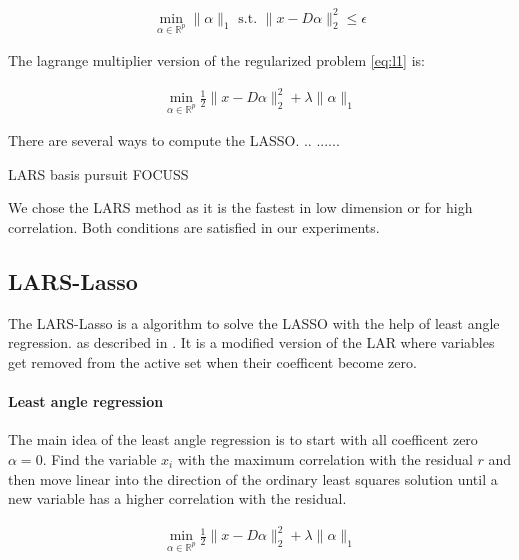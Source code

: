 \begin{align}
\min_{\alpha\in\mathbb{R}^{p}}   \lVert \alpha \rVert_{1}   \textrm{ s.t. } \lVert x - D\alpha \rVert^{2}_{2} \leq \epsilon\label{eq:l1}
\end{align}

The lagrange multiplier version of the regularized problem \ref{eq:l1} is:

\begin{align}
\min_{\alpha\in\mathbb{R}^{p}}  \frac{1}{2} \lVert x - D\alpha \rVert^{2}_{2} + \lambda \lVert \alpha \rVert_{1}
\end{align}

There are several ways to compute the LASSO. .. ...... 

LARS \cite{lars} basis pursuit\cite{BASIS_PURSUIT}  FOCUSS \cite{FOCUSS}

We chose the LARS method as it is the fastest in low dimension or for
high correlation. Both conditions are satisfied in our experiments. 


\subsection {LARS-Lasso}
\label{sec:lars}
The LARS-Lasso is a algorithm to solve the LASSO with the help of least
angle regression. as described in \cite{Efron2004}. It is a modified version of
the LAR where variables get removed from the active set when their coefficent
become zero.

\paragraph{Least angle regression}
The main idea of the least angle regression is to start with all coefficent zero
$\alpha = 0$. Find the variable $x_i$ with the maximum correlation with the
residual $r$ and then move linear into the direction of the ordinary least
squares solution until a new variable has a higher correlation with the
residual. 


\begin{align}
\min_{\alpha\in\mathbb{R}^{p}}  \frac{1}{2} \lVert x - D\alpha \rVert^{2}_{2} + \lambda \lVert \alpha \rVert_{1}
\end{align}

